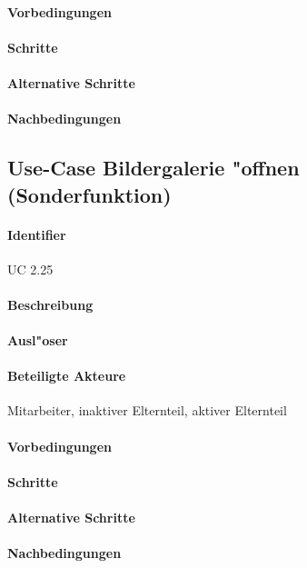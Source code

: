   \paragraph{Vorbedingungen}
  \paragraph{Schritte}
  \paragraph{Alternative Schritte}
  \paragraph{Nachbedingungen}

  
  \newpage
 \subsection{Use-Case Bildergalerie "offnen (Sonderfunktion)}
  \paragraph{Identifier}
  UC 2.25
  \paragraph{Beschreibung}
  \paragraph{Ausl"oser}
  \paragraph{Beteiligte Akteure}   \leavevmode \newline
    Mitarbeiter, inaktiver Elternteil, aktiver Elternteil
  \paragraph{Vorbedingungen}
  \paragraph{Schritte}
  \paragraph{Alternative Schritte}
  \paragraph{Nachbedingungen}

